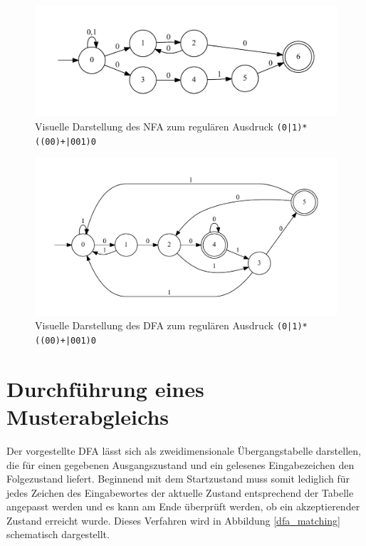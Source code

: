 \begin{figure}[]
	\includegraphics[width=\textwidth]{bilder/nfa_beispiel.pdf}
	\caption{Visuelle Darstellung des NFA zum regulären Ausdruck \texttt{(0|1)*((00)+|001)0}}
	\label{nfa_beispiel}
\end{figure}

\begin{figure}[]
	\includegraphics[width=\textwidth]{bilder/dfa_beispiel.pdf}
	\caption{Visuelle Darstellung des DFA zum regulären Ausdruck \texttt{(0|1)*((00)+|001)0}}
	\label{dfa_beispiel}
\end{figure}

\section{Durchführung eines Musterabgleichs}

Der vorgestellte DFA lässt sich als zweidimensionale Übergangstabelle darstellen, die für einen gegebenen Ausgangszustand und ein gelesenes Eingabezeichen den Folgezustand liefert.
Beginnend mit dem Startzustand muss somit lediglich für jedes Zeichen des Eingabewortes der aktuelle Zustand entsprechend der Tabelle angepasst werden und es kann am Ende überprüft werden, ob ein akzeptierender Zustand erreicht wurde.
Dieses Verfahren wird in Abbildung \ref{dfa_matching} schematisch dargestellt.

